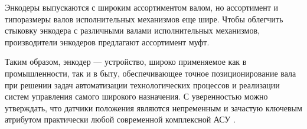 Энкодеры выпускаются с широким ассортиментом валом, но ассортимент и типоразмеры валов исполнительных механизмов еще шире. Чтобы облегчить стыковку энкодера с различными валами исполнительных механизмов, производители энкодеров предлагают ассортимент муфт.

Таким образом, энкодер --- устройство, широко применяемое как в промышленности, так и в быту, обеспечивающее точное позиционирование вала при решении задач автоматизации технологических процессов и реализации систем управления самого широкого назначения. С уверенностью можно утверждать, что датчики положения являются непременным и зачастую ключевым атрибутом практически любой современной комплексной АСУ \cite{techcomp:enc}.


